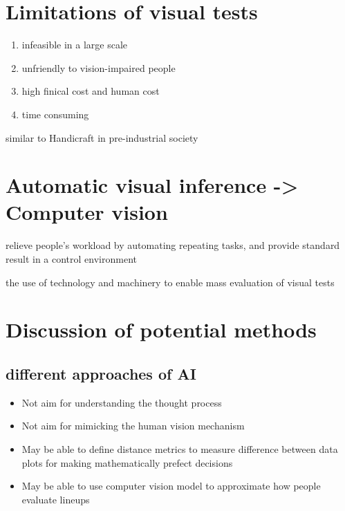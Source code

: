 \documentclass{monashthesis}
\begin{document}
\hypertarget{limitations-of-visual-tests}{%
\section{Limitations of visual tests}\label{limitations-of-visual-tests}}

\begin{enumerate}
\def\labelenumi{\arabic{enumi}.}
\tightlist
\item
  infeasible in a large scale
\item
  unfriendly to vision-impaired people
\item
  high finical cost and human cost
\item
  time consuming
\end{enumerate}

similar to Handicraft in pre-industrial society

\hypertarget{automatic-visual-inference---computer-vision}{%
\section{Automatic visual inference -\textgreater{} Computer vision}\label{automatic-visual-inference---computer-vision}}

relieve people's workload by automating repeating tasks, and provide standard result in a control environment

the use of technology and machinery to enable mass evaluation of visual tests

\hypertarget{discussion-of-potential-methods}{%
\section{Discussion of potential methods}\label{discussion-of-potential-methods}}

\hypertarget{different-approaches-of-ai}{%
\subsection{different approaches of AI}\label{different-approaches-of-ai}}

\begin{itemize}
\tightlist
\item
  Not aim for understanding the thought process
\item
  Not aim for mimicking the human vision mechanism
\item
  May be able to define distance metrics to measure difference between data plots for making mathematically prefect decisions
\item
  May be able to use computer vision model to approximate how people evaluate lineups
\end{itemize}
\end{document}
